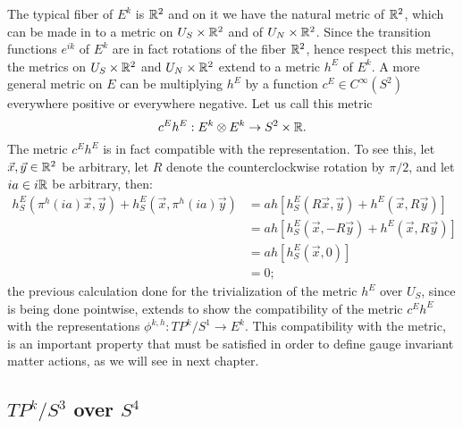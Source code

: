 The typical fiber of $E^k$ is $\mathbb{R}^2$ and on it we have the natural metric of $\mathbb{R}^2$, which can be made in to a metric on $U_S \times \mathbb{R}^2$ and of $U_N \times \mathbb{R}^2$. Since the transition functions $e^{ik}$ of $E^k$ are in fact rotations of the fiber $\mathbb{R}^2$, hence respect this metric, the metrics on $U_S \times \mathbb{R}^2$ and $U_N \times \mathbb{R}^2$ extend to a metric $h^E$ of $E^k$. A more general metric on $E$ can be multiplying $h^E$ by a function $c^E \in C^\infty(S^2)$ everywhere positive or everywhere negative. Let us call this metric
\begin{equation}\label{equationMetricEkRepresentationcEhES2}
    c^E h^E : E^k \otimes E^k \to S^2 \times \mathbb{R}.
\end{equation}
The metric $c^E h^E$ is in fact compatible with the representation. To see this, let $\vec x, \vec y \in \mathbb{R}^2$ be arbitrary, let $R$ denote the counterclockwise rotation by $\pi/2$, and let $ia \in i\mathbb{R}$ be arbitrary, then:
\begin{align*}
    h^E_S(\pi^h(ia) \vec x, \vec y) + h^E_S(\vec x, \pi^h(ia) \vec y) &= ah[h^E_S(R \vec x, \vec y) + h^E(\vec x, R \vec y)]\\
        &= ah[h^E_S(\vec x, -R \vec y) + h^E(\vec x, R \vec y)]\\
        &= ah[h^E_S(\vec x, 0)]\\
        &= 0;
\end{align*}
the previous calculation done for the trivialization of the metric $h^E$ over $U_S$, since is being done pointwise, extends to show the compatibility of the metric $c^E h^E$ with the representations $\phi^{k, h}: TP^k/S^1 \to E^k$. This compatibility with the metric, is an important property that must be satisfied in order to define gauge invariant matter actions, as we will see in next chapter.

\subsection{$TP^k/S^3$ over $S^4$}
\label{chIntegrationSubsectionS2}

